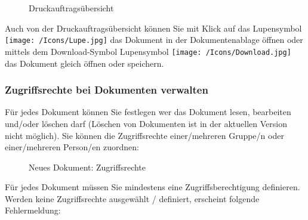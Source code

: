 \begin{figure}[H]
\caption{Druckauftragsübersicht}
\end{figure}

Auch von der Druckauftragsübersicht können Sie mit Klick auf das Lupensymbol \texttt{[image: /Icons/Lupe.jpg]}  das Dokument in der Dokumentenablage öffnen oder mittels dem Download-Symbol Lupensymbol \texttt{[image: /Icons/Download.jpg]}  das Dokument gleich öffnen oder speichern.


\subsubsection{Zugriffsrechte bei Dokumenten verwalten}
\label{bkm:Ref442869495}

Für jedes Dokument können Sie festlegen wer das Dokument lesen, bearbeiten und/oder löschen darf (Löschen von Dokumenten ist in der aktuellen Version nicht möglich). Sie können die Zugriffsrechte einer/mehreren Gruppe/n oder einer/mehreren Person/en zuordnen:

\begin{figure}[H]
\caption{Neues Dokument: Zugriffsrechte}
\end{figure}

Für jedes Dokument müssen Sie mindestens eine Zugriffsberechtigung definieren. Werden keine Zugriffsrechte ausgewählt / definiert, erscheint folgende Fehlermeldung:

